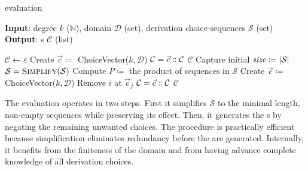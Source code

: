 \begin{algorithm}
    \caption{ evaluation}
    \label{alg:algo}
    \textbf{Input}:
    degree \(k\) (\(\mathbb{N}\)),
    domain \(\mathcal{D}\) (set),
    derivation choice-sequences \(\mathcal{S}\) (set)\\
    \textbf{Output}: s \(\mathcal{C}\) (list)
    \begin{algorithmic}[1]
        \State \(\mathcal{C} \gets \varepsilon \)
        \label{alg:step0}
            \State Create \(\vec{c} \coloneqq\) ChoiceVector(\(k, \mathcal{D}\))
            \State \(\mathcal{C} \gets \vec{c} \dblcolon\mathcal{C} \)
        \EndIf
        \State \Return \(\mathcal{C}\)\label{alg:step0end}
        \EndIf
        \Do \; Capture initial \(\text{\textit{size}} \coloneqq |\mathcal{S}|\)
        \State \(\mathcal{S} \gets \textsc{Simplify}(\mathcal{S})\)\label{alg:step1}
        \State Compute \(P \coloneqq\) the product of sequences in \(\mathcal{S}\)\label{alg:step2}
         
        \State Create \(\vec{c} \coloneqq\) ChoiceVector(\(k, \mathcal{D}\))
          
        \State Remove \(i\) at \(\vec{c}_j\)
        \EndFor
            \State \(\mathcal{C} \gets \vec{c} \dblcolon\mathcal{C} \)\label{alg:add}\label{alg:step2end}
        \EndIf
        \EndFor
        \State \Return \(\mathcal{C}\)
    \end{algorithmic}
\end{algorithm}

The evaluation operates in two steps.
First it simplifies \(\mathcal{S}\) to the minimal length, non-empty sequences while preserving its effect.
Then, it generates the s by negating the remaining unwanted choices.
The procedure is practically efficient because simplification eliminates redundancy before the  are generated.
Internally, it benefits from the finiteness of the domain and from having advance complete knowledge of all derivation choices.

